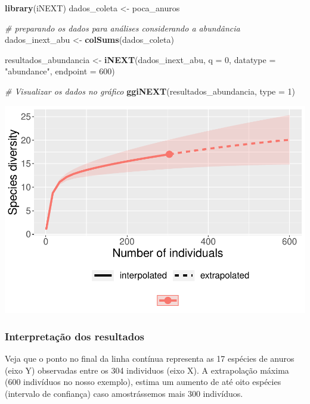 \documentclass[
]{book}
\newenvironment{Shaded}{\begin{snugshade}}{\end{snugshade}}
\newcommand{\CommentTok}[1]{\textcolor[rgb]{0.56,0.35,0.01}{\textit{#1}}}
\newcommand{\DataTypeTok}[1]{\textcolor[rgb]{0.13,0.29,0.53}{#1}}
\newcommand{\DecValTok}[1]{\textcolor[rgb]{0.00,0.00,0.81}{#1}}
\newcommand{\KeywordTok}[1]{\textcolor[rgb]{0.13,0.29,0.53}{\textbf{#1}}}
\newcommand{\NormalTok}[1]{#1}
\newcommand{\StringTok}[1]{\textcolor[rgb]{0.31,0.60,0.02}{#1}}
\begin{document}
\begin{Shaded}
\begin{Highlighting}[]
\KeywordTok{library}\NormalTok{(iNEXT)}
\NormalTok{dados_coleta <-}\StringTok{ }\NormalTok{poca_anuros}

\CommentTok{# preparando os dados para análises considerando a abundância}
\NormalTok{dados_inext_abu <-}\StringTok{ }\KeywordTok{colSums}\NormalTok{(dados_coleta) }

\NormalTok{resultados_abundancia <-}\StringTok{ }\KeywordTok{iNEXT}\NormalTok{(dados_inext_abu, }\DataTypeTok{q =} \DecValTok{0}\NormalTok{, }\DataTypeTok{datatype =} \StringTok{"abundance"}\NormalTok{, }
			\DataTypeTok{endpoint =} \DecValTok{600}\NormalTok{)}

\CommentTok{# Visualizar os dados no gráfico}
\KeywordTok{ggiNEXT}\NormalTok{(resultados_abundancia, }\DataTypeTok{type =} \DecValTok{1}\NormalTok{)}
\end{Highlighting}
\end{Shaded}

\includegraphics{livro_r_ecologia_files/figure-latex/unnamed-chunk-32-1.pdf}

\hypertarget{interpretauxe7uxe3o-dos-resultados-6}{%
\subsubsection{Interpretação dos resultados}\label{interpretauxe7uxe3o-dos-resultados-6}}

Veja que o ponto no final da linha contínua representa as 17 espécies de anuros (eixo Y) observadas entre os 304 individuos (eixo X). A extrapolação máxima (600 indivíduos no nosso exemplo), estima um aumento de até oito espécies (intervalo de confiança) caso amostrássemos mais 300 indivíduos.
\end{document}
